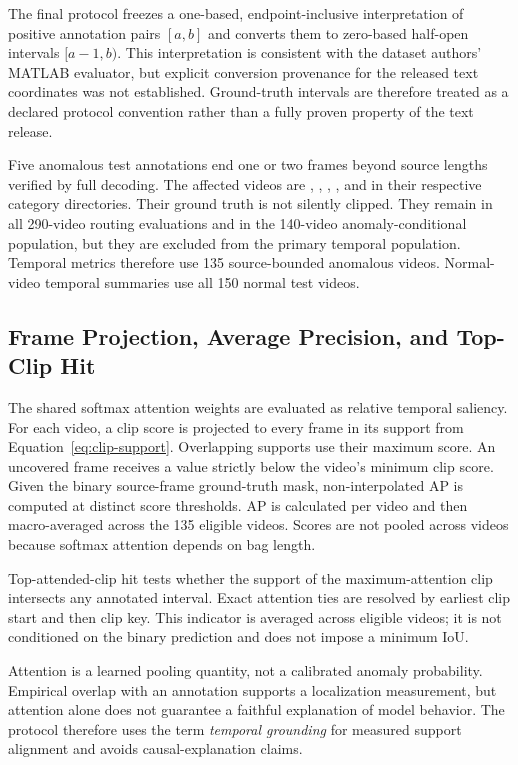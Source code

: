 The final protocol freezes a one-based, endpoint-inclusive interpretation of positive annotation pairs $[a,b]$ and converts them to zero-based half-open intervals $[a-1,b)$. This interpretation is consistent with the dataset authors' MATLAB evaluator, but explicit conversion provenance for the released text coordinates was not established. Ground-truth intervals are therefore treated as a declared protocol convention rather than a fully proven property of the text release.

Five anomalous test annotations end one or two frames beyond source lengths verified by full decoding. The affected videos are , , , , and  in their respective category directories. Their ground truth is not silently clipped. They remain in all 290-video routing evaluations and in the 140-video anomaly-conditional population, but they are excluded from the primary temporal population. Temporal metrics therefore use 135 source-bounded anomalous videos. Normal-video temporal summaries use all 150 normal test videos.

\subsection{Frame Projection, Average Precision, and Top-Clip Hit}

The shared softmax attention weights are evaluated as relative temporal saliency. For each video, a clip score is projected to every frame in its support from Equation~\ref{eq:clip-support}. Overlapping supports use their maximum score. An uncovered frame receives a value strictly below the video's minimum clip score. Given the binary source-frame ground-truth mask, non-interpolated AP is computed at distinct score thresholds. AP is calculated per video and then macro-averaged across the 135 eligible videos. Scores are not pooled across videos because softmax attention depends on bag length.

Top-attended-clip hit tests whether the support of the maximum-attention clip intersects any annotated interval. Exact attention ties are resolved by earliest clip start and then clip key. This indicator is averaged across eligible videos; it is not conditioned on the binary prediction and does not impose a minimum IoU.

Attention is a learned pooling quantity, not a calibrated anomaly probability. Empirical overlap with an annotation supports a localization measurement, but attention alone does not guarantee a faithful explanation of model behavior. The protocol therefore uses the term \emph{temporal grounding} for measured support alignment and avoids causal-explanation claims.

